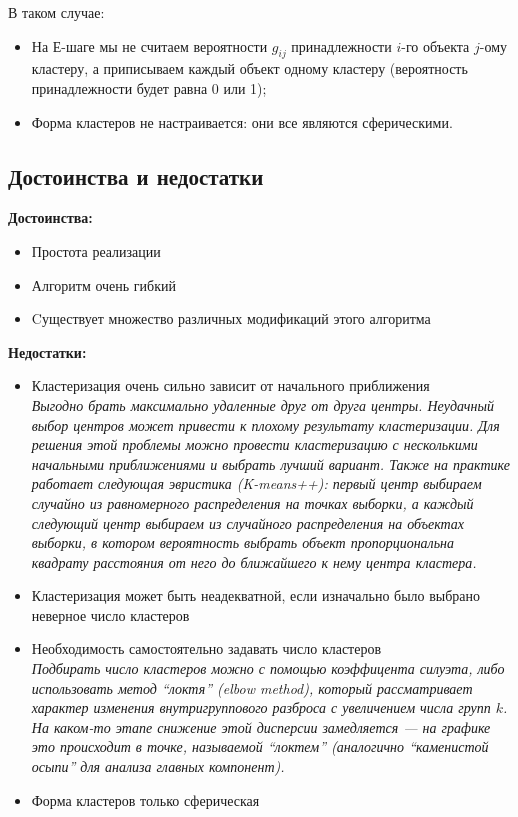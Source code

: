 \documentclass[10pt]{article}
\begin{document}
	В таком случае:
	\begin{itemize}
		\item На Е-шаге мы не считаем вероятности $g_{ij}$ принадлежности $i$-го объекта $j$-ому кластеру, а приписываем каждый объект одному кластеру (вероятность принадлежности будет равна 0 или 1);
		\item Форма кластеров не настраивается: они все являются сферическими.
	\end{itemize}
	
	\subsection{Достоинства и недостатки}
	\textbf{Достоинства:}
	\begin{itemize} 
		\item Простота реализации
		\item Алгоритм очень гибкий 
		\item Cуществует множество различных модификаций этого алгоритма
	\end{itemize}
	
	\textbf{Недостатки:} 
	\begin{itemize}
		\item Кластеризация очень сильно зависит от начального приближения\\
		\textit{Выгодно брать максимально удаленные друг от друга центры. Неудачный выбор центров может привести к плохому результату кластеризации. Для решения этой проблемы можно провести кластеризацию с несколькими начальными приближениями и выбрать лучший вариант.
		Также на практике работает следующая эвристика (K-means++): первый центр выбираем случайно из равномерного распределения на точках выборки, а каждый следующий центр выбираем из случайного распределения на объектах выборки, в котором вероятность выбрать объект пропорциональна квадрату расстояния от него до ближайшего к нему центра кластера.}
		
		\item Кластеризация может быть неадекватной, если изначально было выбрано неверное число кластеров 
		\item Необходимость самостоятельно задавать число кластеров\\ 
		\textit{Подбирать число кластеров можно с помощью коэффицента силуэта, либо использовать метод “локтя” (elbow method), который рассматривает характер изменения внутригруппового разброса с увеличением числа групп $k$. На каком-то этапе снижение этой дисперсии замедляется --- на графике это происходит в точке, называемой “локтем” (аналогично “каменистой осыпи” для анализа главных компонент).}
		
		\item Форма кластеров только сферическая
	\end{itemize}
\end{document}
